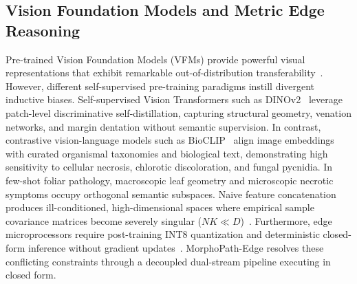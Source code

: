 \subsection{Vision Foundation Models and Metric Edge Reasoning}
\label{subsec:related_vfm_edge}
Pre-trained Vision Foundation Models (VFMs) provide powerful visual representations that exhibit remarkable out-of-distribution transferability~\cite{oquab2023dinov2}. However, different self-supervised pre-training paradigms instill divergent inductive biases. Self-supervised Vision Transformers such as DINOv2~\cite{oquab2023dinov2} leverage patch-level discriminative self-distillation, capturing structural geometry, venation networks, and margin dentation without semantic supervision. In contrast, contrastive vision-language models such as BioCLIP~\cite{stevens2024bioclip} align image embeddings with curated organismal taxonomies and biological text, demonstrating high sensitivity to cellular necrosis, chlorotic discoloration, and fungal pycnidia. In few-shot foliar pathology, macroscopic leaf geometry and microscopic necrotic symptoms occupy orthogonal semantic subspaces. Naive feature concatenation produces ill-conditioned, high-dimensional spaces where empirical sample covariance matrices become severely singular ($N K \ll D$)~\cite{ledoit2004well}. Furthermore, edge microprocessors require post-training INT8 quantization and deterministic closed-form inference without gradient updates~\cite{jacob2018quantization}. MorphoPath-Edge resolves these conflicting constraints through a decoupled dual-stream pipeline executing in closed form.